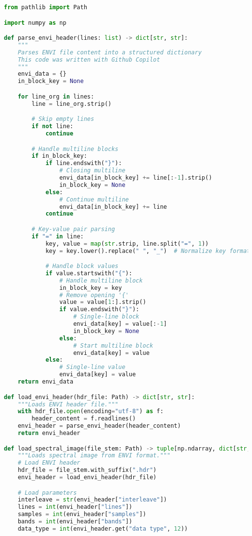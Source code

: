 \begin{lstlisting}[language=python, caption=Load ENVI format images, label={code:load-envi}]
from pathlib import Path

import numpy as np

def parse_envi_header(lines: list) -> dict[str, str]:
    """
    Parses ENVI file content into a structured dictionary
    This code was written with Github Copilot
    """
    envi_data = {}
    in_block_key = None

    for line_org in lines:
        line = line_org.strip()

        # Skip empty lines
        if not line:
            continue

        # Handle multiline blocks
        if in_block_key:
            if line.endswith("}"):
                # Closing multiline
                envi_data[in_block_key] += line[:-1].strip()
                in_block_key = None
            else:
                # Continue multiline
                envi_data[in_block_key] += line
            continue

        # Key-value pair parsing
        if "=" in line:
            key, value = map(str.strip, line.split("=", 1))
            key = key.lower().replace(" ", "_")  # Normalize key format

            # Handle block values
            if value.startswith("{"):
                # Handle multiline block
                in_block_key = key
                # Remove opening '{'
                value = value[1:].strip()
                if value.endswith("}"):
                    # Single-line block
                    envi_data[key] = value[:-1]
                    in_block_key = None
                else:
                    # Start multiline block
                    envi_data[key] = value
            else:
                # Single-line value
                envi_data[key] = value
    return envi_data

def load_envi_header(hdr_file: Path) -> dict[str, str]:
    """Loads ENVI header file."""
    with hdr_file.open(encoding="utf-8") as f:
        header_content = f.readlines()
    envi_header = parse_envi_header(header_content)
    return envi_header

def load_spectral_image(file_stem: Path) -> tuple[np.ndarray, dict[str, str]]:
    """Loads spectral image from ENVI format."""
    # Load ENVI header
    hdr_file = file_stem.with_suffix(".hdr")
    envi_header = load_envi_header(hdr_file)

    # Load parameters
    interleave = str(envi_header["interleave"])
    lines = int(envi_header["lines"])
    samples = int(envi_header["samples"])
    bands = int(envi_header["bands"])
    data_type = int(envi_header.get("data type", 12))


\end{lstlisting}

